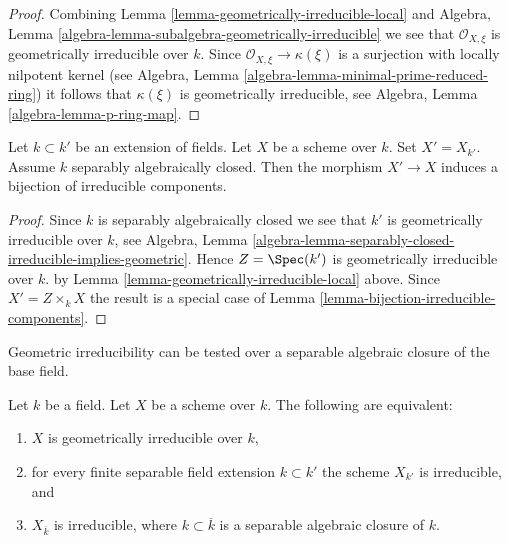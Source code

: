 \begin{proof}
Combining
Lemma \ref{lemma-geometrically-irreducible-local}
and
Algebra, Lemma \ref{algebra-lemma-subalgebra-geometrically-irreducible}
we see that $\mathcal{O}_{X, \xi}$ is geometrically irreducible over $k$.
Since $\mathcal{O}_{X, \xi} \to \kappa(\xi)$ is a surjection with
locally nilpotent kernel (see
Algebra, Lemma \ref{algebra-lemma-minimal-prime-reduced-ring})
it follows that $\kappa(\xi)$ is geometrically irreducible, see
Algebra, Lemma \ref{algebra-lemma-p-ring-map}.
\end{proof}

\begin{lemma}
\label{lemma-separably-closed-field-irreducible-components}
Let $k \subset k'$ be an extension of fields.
Let $X$ be a scheme over $k$. Set $X' = X_{k'}$.
Assume $k$ separably algebraically closed.
Then the morphism $X' \to X$ induces a bijection of irreducible components.
\end{lemma}

\begin{proof}
Since $k$ is separably algebraically closed we see that
$k'$ is geometrically irreducible over $k$, see Algebra,
Lemma \ref{algebra-lemma-separably-closed-irreducible-implies-geometric}.
Hence $Z = \Spec(k')$ is geometrically irreducible over $k$.
by Lemma \ref{lemma-geometrically-irreducible-local} above.
Since $X' = Z \times_k X$ the result is a special case
of Lemma \ref{lemma-bijection-irreducible-components}.
\end{proof}

\begin{lemma}
\label{lemma-characterize-geometrically-irreducible}
\begin{slogan}
Geometric irreducibility can be tested over a separable algebraic
closure of the base field.
\end{slogan}
Let $k$ be a field. Let $X$ be a scheme over $k$.
The following are equivalent:
\begin{enumerate}
\item $X$ is geometrically irreducible over $k$,
\item for every finite separable field extension $k \subset k'$
the scheme $X_{k'}$ is irreducible, and
\item $X_{\overline{k}}$ is irreducible, where $k \subset \overline{k}$
is a separable algebraic closure of $k$.
\end{enumerate}
\end{lemma}

